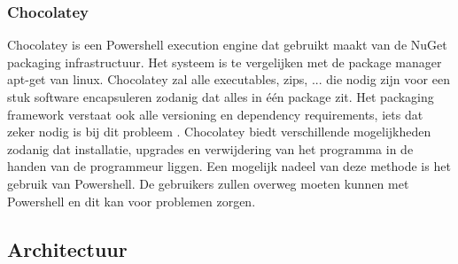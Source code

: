 \documentclass{article}
\begin{document}
\subsubsection{Chocolatey \citep{chocoMain}}
Chocolatey is een Powershell execution engine dat gebruikt maakt van de NuGet packaging infrastructuur.
Het systeem is te vergelijken met de package manager apt-get van linux.
Chocolatey zal alle executables, zips, ... die nodig zijn voor een stuk software encapsuleren zodanig dat alles in \'e\'en package zit.
Het packaging framework verstaat ook alle versioning en dependency requirements, iets dat zeker nodig is bij dit probleem \citep{chocoDoc}.
Chocolatey biedt verschillende mogelijkheden zodanig dat installatie, upgrades en verwijdering van het programma in de handen van de programmeur liggen.
Een mogelijk nadeel van deze methode is het gebruik van Powershell. 
De gebruikers zullen overweg moeten kunnen met Powershell en dit kan voor problemen zorgen.

\subsection{Architectuur}


%

\end{document}
